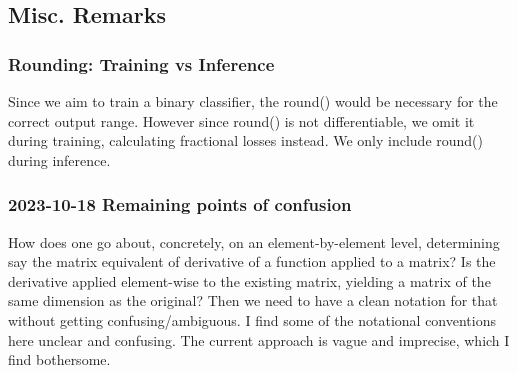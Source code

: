\documentclass{article}
\begin{document}
\subsection{Misc. Remarks}
\subsubsection{Rounding: Training vs Inference} Since we aim to train a binary classifier, the round() would be necessary for the correct output range. However since round() is not differentiable, we omit it during training, calculating fractional losses instead. We only include round() during inference.
\subsubsection{2023-10-18 Remaining points of confusion} How does one go about, concretely, on an element-by-element
level, determining say the matrix equivalent of derivative of a function applied to a matrix? 
Is the derivative applied element-wise to the existing matrix, yielding a matrix of the same dimension as the original?
Then we need to have a clean notation for that without getting confusing/ambiguous. I find some of the notational
conventions here unclear and confusing. The current approach is vague and imprecise, which I find bothersome.
\end{document}

